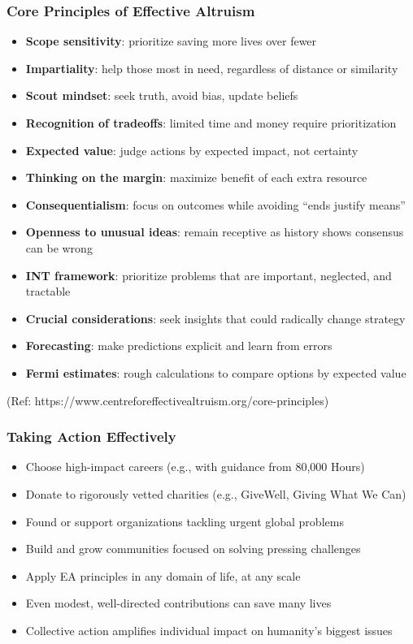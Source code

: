 \begin{frame}[fragile]\frametitle{Core Principles of Effective Altruism}
  \begin{itemize}
    \item \textbf{Scope sensitivity}: prioritize saving more lives over fewer
    \item \textbf{Impartiality}: help those most in need, regardless of distance or similarity
    \item \textbf{Scout mindset}: seek truth, avoid bias, update beliefs
    \item \textbf{Recognition of tradeoffs}: limited time and money require prioritization
    \item \textbf{Expected value}: judge actions by expected impact, not certainty
    \item \textbf{Thinking on the margin}: maximize benefit of each extra resource
    \item \textbf{Consequentialism}: focus on outcomes while avoiding “ends justify means”
    \item \textbf{Openness to unusual ideas}: remain receptive as history shows consensus can be wrong
    \item \textbf{INT framework}: prioritize problems that are important, neglected, and tractable
    \item \textbf{Crucial considerations}: seek insights that could radically change strategy
    \item \textbf{Forecasting}: make predictions explicit and learn from errors
    \item \textbf{Fermi estimates}: rough calculations to compare options by expected value
  \end{itemize}
  
{\tiny (Ref: https://www.centreforeffectivealtruism.org/core-principles)}  	  
  
\end{frame}

\begin{frame}[fragile]\frametitle{Taking Action Effectively}
  \begin{itemize}
    \item Choose high-impact careers (e.g., with guidance from 80,000 Hours)
    \item Donate to rigorously vetted charities (e.g., GiveWell, Giving What We Can)
    \item Found or support organizations tackling urgent global problems
    \item Build and grow communities focused on solving pressing challenges
    \item Apply EA principles in any domain of life, at any scale
    \item Even modest, well-directed contributions can save many lives
    \item Collective action amplifies individual impact on humanity’s biggest issues
  \end{itemize}
  
  
\end{frame}



